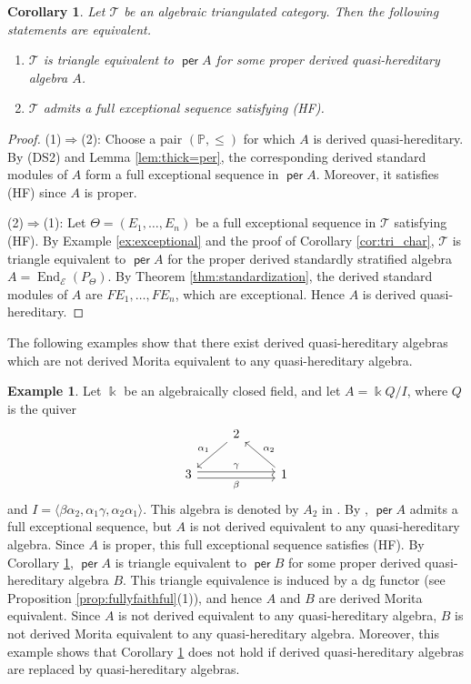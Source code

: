 \documentclass[a4paper,reqno,11pt]{amsart}
\numberwithin{equation}{section}
\newtheorem{corollary}[theorem]{Corollary}
\theoremstyle{definition}
\newtheorem{example}[theorem]{Example}
\newcommand{\E}{\mathcal{E}}
\newcommand{\T}{\mathcal{T}}
\newcommand{\PP}{\mathbb{P}}
\newcommand{\bte}{\Theta}
\newcommand{\kk}{\Bbbk}
\DeclareMathOperator{\per}{\mathsf{per}}
\DeclareMathOperator{\End}{End}
\begin{document}
\begin{corollary}\label{cor:exc_char}
Let $\T$ be an algebraic triangulated category.
Then the following statements are equivalent.
\begin{enumerate}
\item $\T$ is triangle equivalent to $\per A$ for some proper derived quasi-hereditary algebra $A$.
\item $\T$ admits a full exceptional sequence satisfying (HF).
\end{enumerate}
\end{corollary}
\begin{proof}
(1)$\Rightarrow$(2): Choose a pair $(\PP,\leq)$ for which $A$ is derived quasi-hereditary. By (DS2) and Lemma \ref{lem:thick=per}, the corresponding derived standard modules of $A$ form a full exceptional sequence in $\per A$.
Moreover, it satisfies (HF) since $A$ is proper.

(2)$\Rightarrow$(1): Let $\bte=(E_{1},\ldots,E_{n})$ be a full exceptional sequence in $\T$ satisfying (HF).
By Example \ref{ex:exceptional} and the proof of Corollary \ref{cor:tri_char}, $\T$ is triangle equivalent to $\per A$ for the proper derived standardly stratified algebra $A=\End_{\E}(P_{\bte})$.
By Theorem \ref{thm:standardization}, the derived standard modules of $A$ are $FE_{1},\ldots,FE_{n}$, which are exceptional.
Hence $A$ is derived quasi-hereditary.
\end{proof}

The following examples show that there exist derived quasi-hereditary algebras which are not derived Morita equivalent to any quasi-hereditary algebra.

\begin{example}\label{ex:Kalck}
Let $\kk$ be an algebraically closed field, and let $A=\kk Q/I$, where $Q$ is the quiver
\[
\begin{tikzcd}
& 2 \arrow[dl, "\alpha_{1}"'] & \\
3 \arrow[rr, shift left, "\gamma"] \arrow[rr, shift right, "\beta"'] & & 1 \arrow[ul, "\alpha_{2}"']
\end{tikzcd}
\]
and $I=\langle\beta\alpha_{2},\alpha_{1}\gamma,\alpha_{2}\alpha_{1}\rangle$.
This algebra is denoted by $A_{2}$ in \cite{Ka17}.
By \cite[Example 2.23 and Proposition 5.6]{Ka17}, $\per A$ admits a full exceptional sequence, but $A$ is not derived equivalent to any quasi-hereditary algebra.
Since $A$ is proper, this full exceptional sequence satisfies (HF).
By Corollary \ref{cor:exc_char}, $\per A$ is triangle equivalent to $\per B$ for some proper derived quasi-hereditary algebra $B$.
This triangle equivalence is induced by a dg functor (see Proposition \ref{prop:fullyfaithful}(1)), and hence $A$ and $B$ are derived Morita equivalent.
Since $A$ is not derived equivalent to any quasi-hereditary algebra, $B$ is not derived Morita equivalent to any quasi-hereditary algebra.
Moreover, this example shows that Corollary \ref{cor:exc_char} does not hold if derived quasi-hereditary algebras are replaced by quasi-hereditary algebras.
\end{example}
\end{document}
